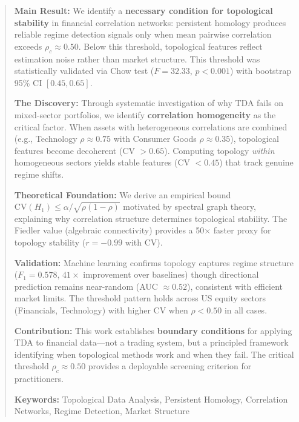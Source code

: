 \documentclass[12pt,letterpaper]{article}
\begin{document}
\begin{abstract}
\noindent \textbf{Main Result:} We identify a \textbf{necessary condition for topological stability} in financial correlation networks: persistent homology produces reliable regime detection signals only when mean pairwise correlation exceeds $\rho_c \approx 0.50$. Below this threshold, topological features reflect estimation noise rather than market structure. This threshold was statistically validated via Chow test ($F = 32.33$, $p < 0.001$) with bootstrap 95\% CI $[0.45, 0.65]$.

\textbf{The Discovery:} Through systematic investigation of why TDA fails on mixed-sector portfolios, we identify \textbf{correlation homogeneity} as the critical factor. When assets with heterogeneous correlations are combined (e.g., Technology $\rho \approx 0.75$ with Consumer Goods $\rho \approx 0.35$), topological features become decoherent (CV $> 0.65$). Computing topology \textit{within} homogeneous sectors yields stable features (CV $< 0.45$) that track genuine regime shifts.

\textbf{Theoretical Foundation:} We derive an empirical bound $\text{CV}(H_1) \leq \alpha/\sqrt{\rho(1-\rho)}$ motivated by spectral graph theory, explaining why correlation structure determines topological stability. The Fiedler value (algebraic connectivity) provides a 50$\times$ faster proxy for topology stability ($r = -0.99$ with CV).

\textbf{Validation:} Machine learning confirms topology captures regime structure ($F_1 = 0.578$, $41\times$ improvement over baselines) though directional prediction remains near-random (AUC $\approx 0.52$), consistent with efficient market limits. The threshold pattern holds across US equity sectors (Financials, Technology) with higher CV when $\rho < 0.50$ in all cases.

\textbf{Contribution:} This work establishes \textbf{boundary conditions} for applying TDA to financial data---not a trading system, but a principled framework identifying when topological methods work and when they fail. The critical threshold $\rho_c \approx 0.50$ provides a deployable screening criterion for practitioners.

\vspace{0.1in}

\noindent\textbf{Keywords:} Topological Data Analysis, Persistent Homology, Correlation Networks, Regime Detection, Market Structure
\end{abstract}
\end{document}

